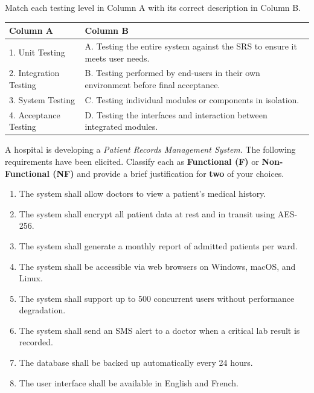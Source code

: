 \documentclass[11pt]{article}
\newcounter{popsec}
\newcounter{popsub}
\newcommand{\courssub}[1]{%
  \stepcounter{popsub}%
  \par\vspace{9pt}\noindent{\popxbold\fontsize{11.5}{13}\selectfont\color{popink}{\color{poporange}\thepopsec.\thepopsub}\hspace{6pt}#1}\par\nopagebreak\vspace{4pt}
}
\begin{document}
\begin{exercice}
Match each testing level in Column A with its correct description in Column B.

\begin{center}
\begin{tabularx}{\linewidth}{|l|X|}\hline
\textbf{Column A} & \textbf{Column B} \\ \hline
1. Unit Testing & A. Testing the entire system against the SRS to ensure it meets user needs. \\ \hline
2. Integration Testing & B. Testing performed by end-users in their own environment before final acceptance. \\ \hline
3. System Testing & C. Testing individual modules or components in isolation. \\ \hline
4. Acceptance Testing & D. Testing the interfaces and interaction between integrated modules. \\ \hline
\end{tabularx}
\end{center}
\end{exercice}

\courssub{I practise}

\begin{exercice}
A hospital is developing a \emph{Patient Records Management System}. The following requirements have been elicited. Classify each as \textbf{Functional (F)} or \textbf{Non-Functional (NF)} and provide a brief justification for \textbf{two} of your choices.
\begin{enumerate}
    \item The system shall allow doctors to view a patient's medical history.
    \item The system shall encrypt all patient data at rest and in transit using AES-256.
    \item The system shall generate a monthly report of admitted patients per ward.
    \item The system shall be accessible via web browsers on Windows, macOS, and Linux.
    \item The system shall support up to 500 concurrent users without performance degradation.
    \item The system shall send an SMS alert to a doctor when a critical lab result is recorded.
    \item The database shall be backed up automatically every 24 hours.
    \item The user interface shall be available in English and French.
\end{enumerate}
\end{exercice}
\end{document}
